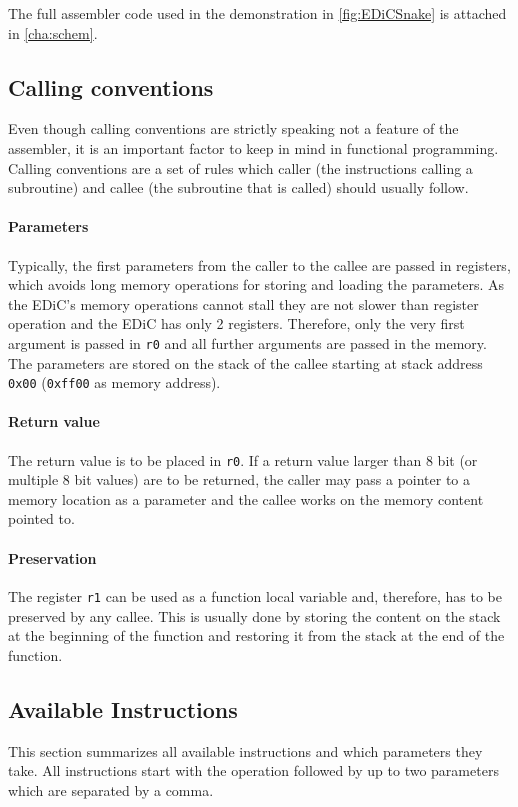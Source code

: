 The full assembler code used in the demonstration in \cref{fig:EDiCSnake} is attached in \cref{cha:schem}.

\subsection{Calling conventions}\label{sec:callingConvention}
Even though calling conventions are strictly speaking not a feature of the assembler, it is an important factor to keep in mind in functional programming.
Calling conventions are a set of rules which caller (the instructions calling a subroutine) and callee (the subroutine that is called) should usually follow.
\paragraph{Parameters}
Typically, the first parameters from the caller to the callee are passed in registers, which avoids long memory operations for storing and loading the parameters.
As the \gls{EDiC}'s memory operations cannot stall they are not slower than register operation and the \gls{EDiC} has only 2 registers.
Therefore, only the very first argument is passed in \texttt{r0} and all further arguments are passed in the memory.
The parameters are stored on the stack of the callee starting at stack address \texttt{0x00} (\texttt{0xff00} as memory address).
\paragraph{Return value}
The return value is to be placed in \texttt{r0}.
If a return value larger than 8 bit (or multiple 8 bit values) are to be returned, the caller may pass a pointer to a memory location as a parameter and the callee works on the memory content pointed to.
\paragraph{Preservation}
The register \texttt{r1} can be used as a function local variable and, therefore, has to be preserved by any callee.
This is usually done by storing the content on the stack at the beginning of the function and restoring it from the stack at the end of the function.

\subsection{Available Instructions}\label{sec:asm_instr}
This section summarizes all available instructions and which parameters they take.
All instructions start with the operation followed by up to two parameters which are separated by a comma.

